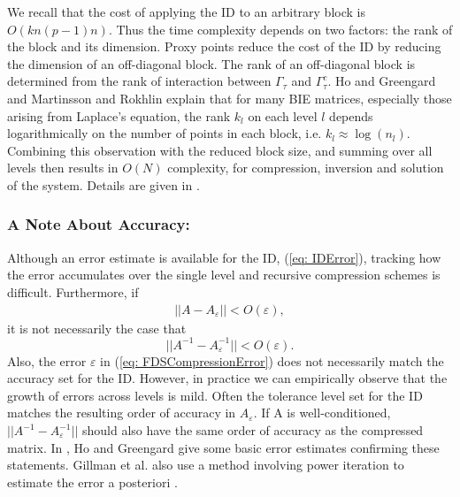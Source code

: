 \documentclass{sfuthesis}
\begin{document}
We recall that the cost of applying the ID to an arbitrary block is $O(kn(p-1)n)$. Thus the time complexity depends on two factors: the rank of the block and its dimension. Proxy points reduce the cost of the ID by reducing the dimension of an off-diagonal block. The rank of an off-diagonal block is determined from the rank of interaction between $\Gamma_\tau$ and $\Gamma_\tau^c$. Ho and Greengard \cite{HoGreen2012} and Martinsson and Rokhlin \cite{MartRokh2005} explain that for many BIE matrices, especially those arising from Laplace's equation, the rank $k_l$ on each level $l$ depends logarithmically on the number of points in each block, i.e. $k_l \approx \log(n_l)$. Combining this observation with the reduced block size, and summing over all levels then results in $O(N)$ complexity, for compression, inversion and solution of the system. Details are given in \cite{HoGreen2012, MartRokh2005}. 


\subsubsection{A Note About Accuracy:}

Although an error estimate is available for the ID, (\ref{eq: IDError}), tracking how the error accumulates over the single level and recursive compression schemes is difficult. Furthermore, if 
\begin{align}
	||A-A_{\varepsilon}||<O(\varepsilon), \label{eq: FDSCompressionError} 
\end{align}
it is not necessarily the case that 
	\[||A^{-1}-A_{\varepsilon}^{-1}||<O(\varepsilon).\] 
Also, the error $\varepsilon$ in (\ref{eq: FDSCompressionError}) does not necessarily match the accuracy set for the ID.
However, in practice we can empirically observe that the growth of errors across levels is mild. Often the tolerance level set for the ID matches the resulting order of accuracy in $A_{\varepsilon}$. 
If A is well-conditioned, $||A^{-1}-A_{\varepsilon}^{-1}||$ should also have the same order of accuracy as the compressed matrix. 
In \cite{HoGreen2012}, Ho and Greengard give some basic error estimates confirming these statements. Gillman et al. also use a method involving power iteration to estimate the error a posteriori \cite{GillYoungMart2012}. 
\end{document}
